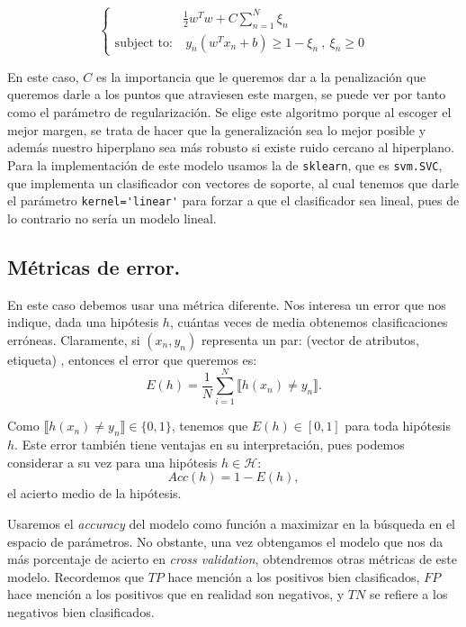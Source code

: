 \documentclass[a4paper, 20pt]{article}
\begin{document}
\[
\begin{cases}
  & \frac{1}{2}w^T w + C \sum_{n = 1}^N \xi_n \\
  \text{subject to:} & \ y_n(w^T x_n + b) \geq 1- \xi_n \ , \ \xi_n \geq 0
\end{cases}
\]

En este caso, $C$ es la importancia que le queremos dar a la penalización que queremos darle a los puntos que atraviesen este margen, se puede ver por tanto como el parámetro de regularización. Se elige este algoritmo porque al escoger el mejor margen, se trata de hacer que la generalización sea lo mejor posible y además nuestro hiperplano sea más robusto si existe ruido cercano al hiperplano. Para la implementación de este modelo usamos la de \lstinline{sklearn}, que es \lstinline{svm.SVC}, que implementa un clasificador con vectores de soporte, al cual tenemos que darle el parámetro \lstinline{kernel='linear'} para forzar a que el clasificador sea lineal, pues de lo contrario no sería un modelo lineal.




\subsection{Métricas de error.}

En este caso debemos usar una métrica diferente. Nos interesa un error que nos indique, dada una hipótesis $h$, cuántas veces de media obtenemos clasificaciones erróneas. Claramente, si $(x_n,y_n)$ representa un par: (vector de atributos, etiqueta) , entonces el error que queremos es:
$$
E(h) = \frac{1}{N} \sum_{i = 1}^N \llbracket h(x_n) \neq y_n \rrbracket.
$$

Como $\llbracket h(x_n) \neq y_n \rrbracket \in \{0,1\}$, tenemos que $E(h) \in [0,1]$ para toda hipótesis $h$. Este error también tiene ventajas en su interpretación, pues podemos considerar a su vez para una hipótesis $h \in \mathcal H$:
$$
Acc(h) = 1 - E(h),
$$
el acierto medio de la hipótesis.

Usaremos el \emph{accuracy} del modelo como función a maximizar en la búsqueda en el espacio de parámetros. No obstante, una vez obtengamos el modelo que nos da más porcentaje de acierto en \emph{cross validation}, obtendremos otras métricas de este modelo. Recordemos que $TP$ hace mención a los positivos bien clasificados, $FP$ hace mención a los positivos que en realidad son negativos, y $TN$ se refiere a los negativos bien clasificados.
\end{document}

